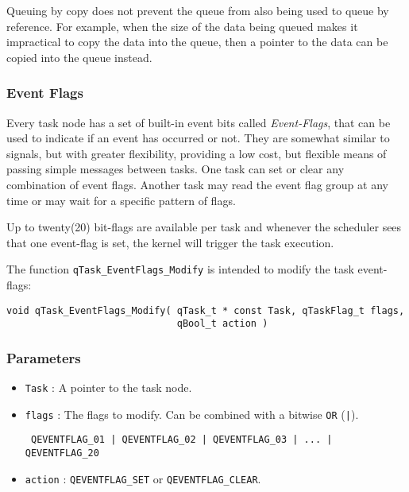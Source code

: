 Queuing by copy does not prevent the queue from also being used to queue by reference. For example, when the size of the data being queued makes it impractical to copy the data into the queue, then a pointer to the data can be copied into the queue instead.

\subsubsection{Event Flags}
Every task node has a set of built-in event bits called \textit{Event-Flags}, that can be used to indicate if an event has occurred or not.  
They are somewhat similar to signals, but with greater flexibility, providing a low cost, but flexible means of passing simple messages between tasks. One task can set or clear any combination of event flags. Another task may read the event flag group at any time or may wait for a specific pattern of flags.  


Up to twenty(20) bit-flags are available per task and whenever the scheduler sees that one event-flag is set, the kernel will trigger the task execution.

The function \lstinline{qTask_EventFlags_Modify} is intended to modify the task event-flags: 
\medskip

\begin{lstlisting}[style=CStyle]
void qTask_EventFlags_Modify( qTask_t * const Task, qTaskFlag_t flags, 
                              qBool_t action )
\end{lstlisting} 

\subsubsection*{Parameters}
\begin{itemize}
    \item \lstinline{Task} : A pointer to the task node.
    \item \lstinline{flags} : The flags to modify. Can be combined with a bitwise \lstinline{OR} (\lstinline{|}).
    
    \lstinline{ QEVENTFLAG_01 | QEVENTFLAG_02 | QEVENTFLAG_03 | ... | QEVENTFLAG_20 }
    \item \lstinline{action} : \lstinline{QEVENTFLAG_SET} or \lstinline{QEVENTFLAG_CLEAR}. 
\end{itemize}

\noindent\hrulefill
\medskip


